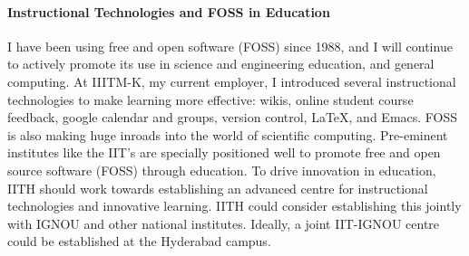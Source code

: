 \documentclass[
9pt, 
]{article}
\begin{document}
\paragraph{Instructional Technologies and FOSS in Education}
I have been using free and open software (FOSS) since 1988,
and I will continue to actively promote its use in science
and engineering education, and general computing.  At
IIITM-K, my current employer, I introduced several
instructional technologies to make learning more effective:
wikis, online student course feedback, google calendar and
groups, version control, \LaTeX, and Emacs.  FOSS is also
making huge inroads into the world of scientific computing.
Pre-eminent institutes like the IIT's are specially
positioned well to promote free and open source software
(FOSS) through education.  To drive innovation in education,
IITH should work towards establishing an advanced centre for
instructional technologies and innovative learning.  IITH
could consider establishing this jointly with IGNOU and
other national institutes.  Ideally, a joint IIT-IGNOU
centre could be established at the Hyderabad campus.






\end{document}
